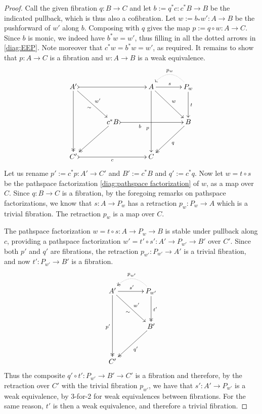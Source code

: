 \documentclass[11pt]{amsart}
\newcommand{\ra}{\ensuremath{\rightarrow}}
\theoremstyle{remark}
\theoremstyle{definition}
\begin{document}
\begin{proof}
Call the given fibration $q:B\ra C$ and let $b:=  q^*c : c^*B \ra B$ be the indicated pullback, which is thus also a cofibration. Let $w := b_*w' : A\ra B$ be the pushforward of $w'$ along $b$.  Composing with $q$ gives the map $p:= q\circ w:A\ra C$.  Since $b$ is monic, we indeed have $b^*w = w'$, thus filling in all the dotted arrows in \eqref{diag:EEP}.  Note moreover that $c^*w =  b^*w = w'$, as required. It remains to show that $p:A\ra C$ is a fibration and $w : A\ra B$ is a weak equivalence.   
\begin{equation}\label{diag:EEPfactored}
\xymatrix@=1.5em{
A' \ar@{->>}[dddd] \ar[rrdd]_{\sim}^{w'} \ar@{>->}[rrrr] && && A \ar[dddd]_>>>>>>>>>>>>p \ar[rrdd]^{w} \ar[rr]^s && \ar@{.>}@/_1.5pc/[ll]_{p_w} P_w \ar[dd]^t \\
\\
&& c^*B \ar@{->>}[lldd] \ar@{>->}[rrrr]_<<<<<<<<<<b  &&&& B \ar@{->>}[lldd]^q  \\
\\
C' \ar@{>->}[rrrr]_c &&&& C &&
}
\end{equation}
Let us rename $p':= c^*p : A' \ra C'$ and $B' := c^*B$ and $q':= c^*q$.
Now let $w=t\circ s$ be the pathspace factorization \eqref{diag:pathspace factorization} of $w$, as a map over $C$.  Since $q:B \ra C$ is a fibration, by the foregoing remarks on pathspace factorizations, we know that $s : A\ra P_w$ has a retraction $p_w : P_w \ra A$ which is a trivial fibration.  The retraction $p_w$ is a map over $C$.  

The pathspace factorization $w=t\circ s : A \ra P_w \ra B$ is stable under pullback along $c$, providing a pathspace factorization $w'=t'\circ s' : A' \ra P_{w'} \ra B'$ over $C'$.  Since both $p'$ and $q'$ are fibrations, the retraction $p_{w'}: P_{w'} \ra A'$ is a trivial fibration, and now $t' : P_{w'} \ra B'$ is a fibration.
\begin{equation}\label{diag:EEPfactored2}
\xymatrix@=1.5em{
A' \ar@{->>}[dddd]_{p'} \ar[rrdd]_{\sim}^{w'}  \ar[rr]^{s'} && \ar@{.>>}@/_1.5pc/[ll]_{p_{w'}} P_{w'} 
	\ar@{->>}[dd]^{t'} \\
\\
&& B' \ar@{->>}[lldd]^{q'} \\
\\
C' &&
}
\end{equation}
Thus the composite $q'\circ t' : P_{w'} \ra B' \ra C'$ is a fibration and therefore, by the retraction over $C'$ with the trivial fibration $p_{w'}$, we have that $s' : A' \ra P_{w'}$ is a weak equivalence, by 3-for-2 for weak equivalences between fibrations.  For the same reason, $t'$ is then a weak equivalence, and therefore a trivial fibration.


\end{proof}
\end{document}
